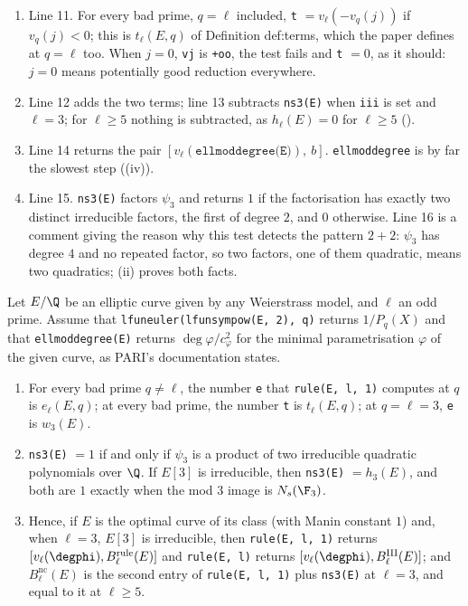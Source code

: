 \begin{sloppypar}
\begin{remark}
\begin{enumerate}[label=(\alph*)]
\item Line 11. For every bad prime, $q=\ell$ included, \texttt{t} $=v_\ell(-v_q(j))$ if $v_q(j)<0$; this is $t_\ell(E,q)$ of Definition def:terms, which
the paper defines at $q=\ell$ too. When $j=0$, \texttt{vj} is \texttt{+oo}, the test fails and \texttt{t} $=0$, as it should: $j=0$ means potentially good
reduction everywhere.
\item Line 12 adds the two terms; line 13 subtracts \texttt{ns3(E)} when \texttt{iii} is set and $\ell=3$; for $\ell\ge5$ nothing is subtracted, as
$h_\ell(E)=0$ for $\ell\ge5$ ().
\item Line 14 returns the pair $[v_\ell(\texttt{ellmoddegree(E)}),\ b]$. \texttt{ellmoddegree} is by far the slowest step
((iv)).
\item Line 15. \texttt{ns3(E)} factors $\psi_3$ and returns $1$ if the factorisation has exactly two distinct irreducible factors, the first of
degree $2$, and $0$ otherwise. Line 16 is a comment giving the reason why this test detects the pattern $2+2$: $\psi_3$ has degree $4$ and no
repeated factor, so two factors, one of them quadratic, means two quadratics; (ii) proves both facts.
\end{enumerate}
\end{remark}

\begin{proposition}\label{prop:computation:rule-correct}
Let $E/\Q$ be an elliptic curve given by any Weierstrass model, and $\ell$ an odd prime. Assume that \texttt{lfuneuler(lfunsympow(E, 2), q)}
returns $1/P_q(X)$ and that \texttt{ellmoddegree(E)} returns $\deg\varphi/c_\varphi^2$ for the minimal parametrisation $\varphi$ of the given curve, as
PARI's documentation states.
\begin{enumerate}[label=(\roman*)]
\item For every bad prime $q\ne\ell$, the number \texttt{e} that \texttt{rule(E, l, 1)} computes at $q$ is $e_\ell(E,q)$; at every bad prime, the
number \texttt{t} is $t_\ell(E,q)$; at $q=\ell=3$, \texttt{e} is $w_3(E)$.
\item \texttt{ns3(E)} $=1$ if and only if $\psi_3$ is a product of two irreducible quadratic polynomials over $\Q$. If $E[3]$ is irreducible, then
\texttt{ns3(E)} $=h_3(E)$, and both are $1$ exactly when the mod $3$ image is $N_s(\F_3)$.
\item Hence, if $E$ is the optimal curve of its class (with Manin constant $1$) and, when $\ell=3$, $E[3]$ is irreducible, then
\texttt{rule(E, l, 1)} returns $[v_\ell(\degphi),B^{\mathrm{rule}}_\ell(E)]$ and \texttt{rule(E, l)} returns $[v_\ell(\degphi),B^{\mathrm{III}}_\ell(E)]$; and
$B^{\mathrm{nc}}_\ell(E)$ is the second entry of \texttt{rule(E, l, 1)} plus \texttt{ns3(E)} at $\ell=3$, and equal to it at $\ell\ge5$.
\end{enumerate}
\end{proposition}


\end{sloppypar}
